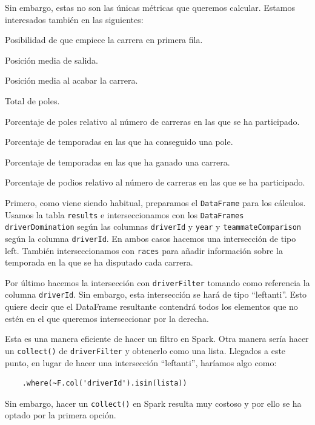 \documentclass[12pt,twoside,titlepage]{report}
\newcommand{\quotes}[1]{``#1''}
\begin{document}
Sin embargo, estas no son las únicas métricas que queremos calcular. Estamos interesados también en las siguientes:

\begin{compactitem}
	\item Posibilidad de que empiece la carrera en primera fila.
	\item Posición media de salida.
	\item Posición media al acabar la carrera.
	\item Total de poles.
	\item Porcentaje de poles relativo al número de carreras en las que se ha participado.
	\item Porcentaje de temporadas en las que ha conseguido una pole.
	\item Porcentaje de temporadas en las que ha ganado una carrera.
	\item Porcentaje de podios relativo al número de carreras en las que se ha participado.
\end{compactitem}

Primero, como viene siendo habitual, preparamos el \texttt{DataFrame} para los cálculos. Usamos la tabla \texttt{results} e interseccionamos con los \texttt{DataFrames} \texttt{driverDomination} según las columnas \texttt{driverId} y \texttt{year} y \texttt{teammateComparison} según la columna \texttt{driverId}. En ambos casos hacemos una intersección de tipo left. También interseccionamos con \texttt{races} para añadir información sobre la temporada en la que se ha disputado cada carrera.

Por último hacemos la intersección con \texttt{driverFilter} tomando como referencia la columna \texttt{driverId}. Sin embargo, esta intersección se hará de tipo \quotes{leftanti}. Esto quiere decir que el DataFrame resultante contendrá todos los elementos que no estén en el que queremos interseccionar por la derecha.

Esta es una manera eficiente de hacer un filtro en Spark. Otra manera sería hacer un \texttt{collect()} de \texttt{driverFilter} y obtenerlo como una lista. Llegados a este punto, en lugar de hacer una intersección \quotes{leftanti}, haríamos algo como:

\begin{lstlisting}
	.where(~F.col('driverId').isin(lista))
\end{lstlisting}

Sin embargo, hacer un \texttt{collect()} en Spark resulta muy costoso y por ello se ha optado por la primera opción.
\end{document}
